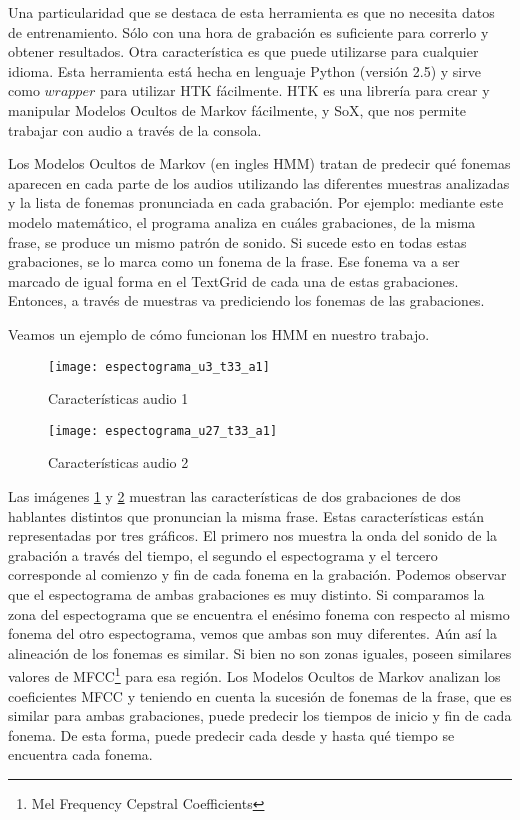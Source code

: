 
Una particularidad que se destaca de esta herramienta es que no necesita datos de entrenamiento. Sólo con una hora de grabación es suficiente para correrlo y obtener resultados. Otra característica es que puede utilizarse para cualquier idioma. Esta herramienta está hecha en lenguaje Python (versión 2.5) y sirve como $wrapper$ para utilizar HTK fácilmente. HTK es una librería para crear y manipular Modelos Ocultos de Markov fácilmente, y SoX, que nos permite trabajar con audio a través de la consola. 

Los Modelos Ocultos de Markov \cite{rabiner} (en ingles HMM) tratan de predecir qué fonemas aparecen en cada parte de los audios utilizando las diferentes muestras analizadas y la lista de fonemas pronunciada en cada grabación. Por ejemplo: mediante este modelo matemático, el programa analiza en cuáles grabaciones, de la misma frase, se produce un mismo patrón de sonido. Si sucede esto en todas estas grabaciones, se lo marca como un fonema de la frase. Ese fonema va a ser marcado de igual forma en el TextGrid de cada una de estas grabaciones. Entonces, a través de muestras va prediciendo los fonemas de las grabaciones.

Veamos un ejemplo de cómo funcionan los HMM en nuestro trabajo. 

\begin{figure}[H]
	\centering
	\texttt{[image: espectograma\_u3\_t33\_a1]} 
	\caption{Características audio 1}
	\label{car_a1}
\end{figure}

\begin{figure}[H]
	\centering
	\texttt{[image: espectograma\_u27\_t33\_a1]} 
	\caption{Características audio 2}
	\label{car_a2}
\end{figure}

Las imágenes \ref{car_a1} y \ref{car_a2} muestran las características de dos grabaciones de dos hablantes distintos que pronuncian la misma frase. Estas características están representadas por tres gráficos. El primero nos muestra la onda del sonido de la grabación a través del tiempo, el segundo el espectograma y el tercero corresponde al comienzo y fin de cada fonema en la grabación. Podemos observar que el espectograma de ambas grabaciones es muy distinto. Si comparamos la zona del espectograma que se encuentra el enésimo fonema con respecto al mismo fonema del otro espectograma, vemos que ambas son muy diferentes. Aún así la alineación de los fonemas es similar. Si bien no son zonas iguales, poseen similares valores de MFCC\footnote{Mel Frequency Cepstral Coefficients} para esa región. Los Modelos Ocultos de Markov analizan los coeficientes MFCC y teniendo en cuenta la sucesión de fonemas de la frase, que es similar para ambas grabaciones, puede predecir los tiempos de inicio y fin de cada fonema. De esta forma, puede predecir cada desde y hasta qué tiempo se encuentra cada fonema.

